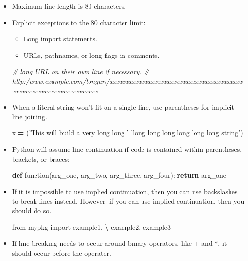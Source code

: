 \documentclass[
]{book}
\newenvironment{Shaded}{\begin{snugshade}}{\end{snugshade}}
\newcommand{\CommentTok}[1]{\textcolor[rgb]{0.56,0.35,0.01}{\textit{#1}}}
\newcommand{\ControlFlowTok}[1]{\textcolor[rgb]{0.13,0.29,0.53}{\textbf{#1}}}
\newcommand{\ImportTok}[1]{#1}
\newcommand{\KeywordTok}[1]{\textcolor[rgb]{0.13,0.29,0.53}{\textbf{#1}}}
\newcommand{\NormalTok}[1]{#1}
\newcommand{\OperatorTok}[1]{\textcolor[rgb]{0.81,0.36,0.00}{\textbf{#1}}}
\newcommand{\StringTok}[1]{\textcolor[rgb]{0.31,0.60,0.02}{#1}}
\providecommand{\tightlist}{%
  \setlength{\itemsep}{0pt}\setlength{\parskip}{0pt}}
\begin{document}
\begin{itemize}
\item
  Maximum line length is 80 characters.
\item
  Explicit exceptions to the 80 character limit:

  \begin{itemize}
  \tightlist
  \item
    Long import statements.
  \item
    URLs, pathnames, or long flags in comments.
  \end{itemize}

\begin{Shaded}
\begin{Highlighting}[]
\CommentTok{# long URL on their own line if necessary. }
\CommentTok{# http:/www.example.com/longurl/xxxxxxxxxxxxxxxxxxxxxxxxxxxxxxxxxxxxxxxxxxxxxxxxxxxxxxxxxxxxxxxxxxxxx}
\end{Highlighting}
\end{Shaded}
\item
  When a literal string won't fit on a single line, use parentheses for implicit
  line joining.

\begin{Shaded}
\begin{Highlighting}[]
\NormalTok{x }\OperatorTok{=}\NormalTok{ (}\StringTok{'This will build a very long long '}
     \StringTok{'long long long long long long string'}\NormalTok{)}
\end{Highlighting}
\end{Shaded}
\item
  Python will assume line continuation if code is contained within parentheses,
  brackets, or braces:

\begin{Shaded}
\begin{Highlighting}[]
\KeywordTok{def}\NormalTok{ function(arg_one, arg_two,}
\NormalTok{             arg_three, arg_four):}
    \ControlFlowTok{return}\NormalTok{ arg_one}
\end{Highlighting}
\end{Shaded}
\item
  If it is impossible to use implied continuation, then you can use backslashes
  to break lines instead. However, if you can use implied continuation, then
  you should do so.

\begin{Shaded}
\begin{Highlighting}[]
\ImportTok{from}\NormalTok{ mypkg }\ImportTok{import}\NormalTok{ example1, }\OperatorTok{\textbackslash{}}
\NormalTok{    example2, example3}
\end{Highlighting}
\end{Shaded}
\item
  If line breaking needs to occur around binary operators, like + and *, it
  should occur before the operator.


\end{itemize}
\end{document}
